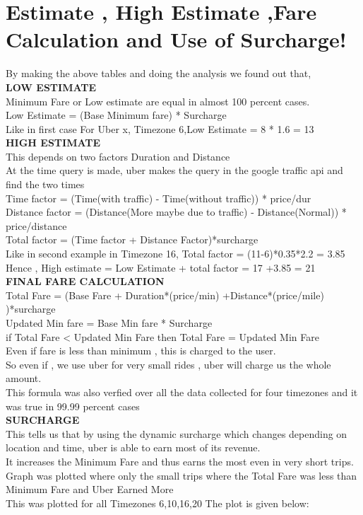 \documentclass{article}
\begin{document}
\section{Estimate , High Estimate ,Fare Calculation and Use of Surcharge!}
By making the above tables and doing the analysis we found out that,
\\\textbf{LOW ESTIMATE}
\\ Minimum Fare or Low estimate are equal in almost 100 percent cases.
\\ Low Estimate = (Base Minimum fare) * Surcharge
\\ Like in first case For Uber x, Timezone 6,Low Estimate = 8 * 1.6 = 13
\pagebreak
\\\textbf{HIGH ESTIMATE}
\\ This depends on two factors Duration and Distance
\\ At the time query is made, uber makes the query in the google traffic api and find the two times
\\ Time factor = (Time(with traffic) - Time(without traffic)) * price/dur 
\\ Distance factor = (Distance(More maybe due to traffic) - Distance(Normal)) * price/distance
\\ Total factor  = (Time factor + Distance Factor)*surcharge
\\ Like in second example in Timezone 16, Total factor = (11-6)*0.35*2.2 = 3.85 
\\ Hence , High estimate = Low Estimate + total factor = 17 +3.85 = 21
\\\textbf{FINAL FARE CALCULATION}
\\ Total Fare = (Base Fare + Duration*(price/min) +Distance*(price/mile) )*surcharge
\\ Updated Min fare = Base Min fare * Surcharge
\\if Total Fare < Updated Min Fare then Total Fare = Updated Min Fare
\\ Even if fare is less than minimum , this is charged to the user.
\\ So even if , we use uber for very small rides , uber will charge us the whole amount.
\\ This formula was also verfied over all the data collected for four timezones and it was true in 99.99 percent cases
\\\textbf{SURCHARGE}
\\ This tells us that by using the dynamic surcharge which changes depending on location and time, uber is able to earn most of its revenue.
\\ It increases the Minimum Fare and thus earns the most even in very short trips.
\\ Graph was plotted where only the small trips where the Total Fare was less than Minimum Fare and Uber Earned More
\\ This was plotted for all Timezones 6,10,16,20
The plot is given below:
\end{document}

